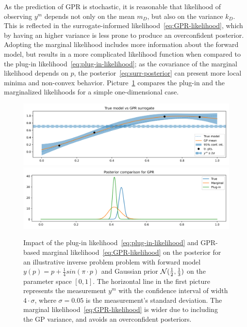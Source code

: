 As the prediction of GPR is stochastic, it is reasonable that likelihood of observing $y^m$ depends not only on the mean $m_D$, but also on the variance $k_D$. 
This is reflected in the surrogate-informed likelihood~\eqref{eq:GPR-likelihood}, which by having an higher variance is less prone to produce an overconfident posterior.
Adopting the marginal likelihood includes more information about the forward model, but results in a more complicated likelihood function when compared to the plug-in likelihood~\eqref{eq:plug-in-likelihood}; as the covariance of the marginal likelihood depends on $p$, the posterior~\ref{eq:surr-posterior} can present more local minima and non-convex behavior. \newline
Picture~\ref{fig:GP-likelihoods} compares the plug-in and the marginalized likelihoods for a simple one-dimensional case.
\begin{figure}[H] 

    \begin{center}
    \includegraphics[width = 360pt]{results/pictures/d1/GP_model_comparison.png}
    \includegraphics[width = 360pt]{results/pictures/d1/GP_posterior_comparison.png}
    \end{center}
    
    \caption{Impact of the plug-in likelihood~\eqref{eq:plug-in-likelihood} and GPR-based marginal likelihood~\eqref{eq:GPR-likelihood} on the posterior for an illustrative inverse problem problem with forward model $y(p) = p +\frac{1}{4} sin(\pi \cdot p)$ and Gaussian prior $\mathcal N(\frac{1}{2}, \frac{1}{3})$ on the parameter space $[0,1]$. The horizontal line in the first picture represents the measurement $y^m$ with the confidence interval of width $4 \cdot \sigma$, where $\sigma = 0.05$ is the measurement's standard deviation. The marginal likelihood~\eqref{eq:GPR-likelihood} is wider due to including the GP variance, and avoids an overconfident posteriors.} 
    \label{fig:GP-likelihoods}
\end{figure}  


